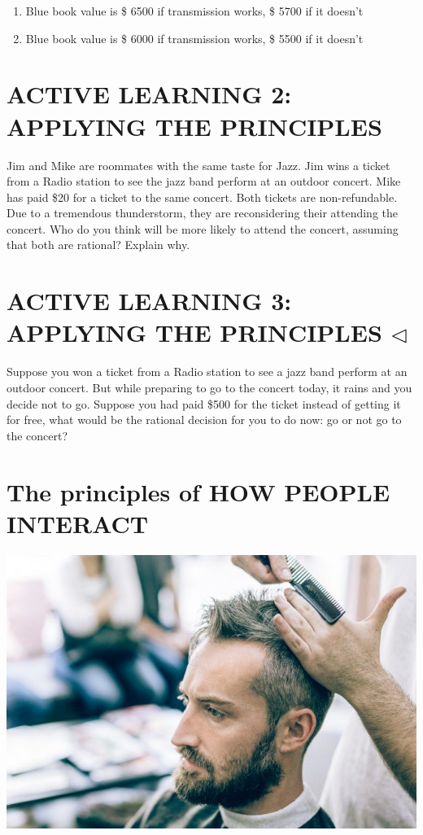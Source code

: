 \documentclass[
]{book}
\begin{document}
\begin{enumerate}
\def\labelenumi{\alph{enumi}.}
\item
  Blue book value is \$ 6500 if transmission works, \$ 5700 if it doesn't
\item
  Blue book value is \$ 6000 if transmission works, \$ 5500 if it doesn't
\end{enumerate}

\hypertarget{active-learning-2-applying-the-principles}{%
\section{ACTIVE LEARNING 2: APPLYING THE PRINCIPLES}\label{active-learning-2-applying-the-principles}}

Jim and Mike are roommates with the same taste for Jazz. Jim wins a ticket from a Radio station to see the jazz band perform at an outdoor concert. Mike has paid \$20 for a ticket to the same concert. Both tickets are non-refundable. Due to a tremendous thunderstorm, they are reconsidering their attending the concert. Who do you think will be more likely to attend the concert, assuming that both are rational? Explain why.

\hypertarget{active-learning-3-applying-the-principles-triangleleft}{%
\section{\texorpdfstring{ACTIVE LEARNING 3: APPLYING THE PRINCIPLES \(\triangleleft\)}{ACTIVE LEARNING 3: APPLYING THE PRINCIPLES \textbackslash triangleleft}}\label{active-learning-3-applying-the-principles-triangleleft}}

Suppose you won a ticket from a Radio station to see a jazz band perform at an outdoor concert. But while preparing to go to the concert today, it rains and you decide not to go. Suppose you had paid \$500 for the ticket instead of getting it for free, what would be the rational decision for you to do now: go or not go to the concert?

\hypertarget{the-principles-of-how-people-interact}{%
\section{The principles of HOW PEOPLE INTERACT}\label{the-principles-of-how-people-interact}}

\includegraphics{imgs/fig2}
\end{document}
